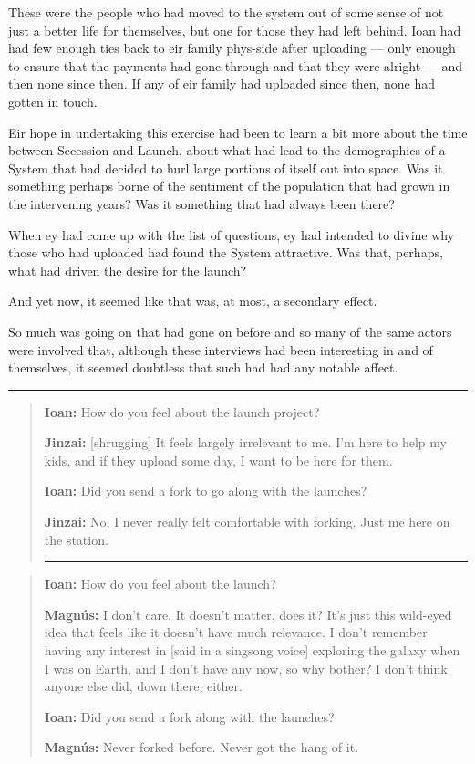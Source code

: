 These were the people who had moved to the system out of some sense of not just a better life for themselves, but one for those they had left behind. Ioan had had few enough ties back to eir family phys-side after uploading — only enough to ensure that the payments had gone through and that they were alright — and then none since then. If any of eir family had uploaded since then, none had gotten in touch.

Eir hope in undertaking this exercise had been to learn a bit more about the time between Secession and Launch, about what had lead to the demographics of a System that had decided to hurl large portions of itself out into space. Was it something perhaps borne of the sentiment of the population that had grown in the intervening years? Was it something that had always been there?

When ey had come up with the list of questions, ey had intended to divine why those who had uploaded had found the System attractive. Was that, perhaps, what had driven the desire for the launch?

And yet now, it seemed like that was, at most, a secondary effect.

So much was going on that had gone on before and so many of the same actors were involved that, although these interviews had been interesting in and of themselves, it seemed doubtless that such had had any notable affect.

\begin{center}\rule{0.5\linewidth}{0.5pt}\end{center}

\begin{quote}
\textbf{Ioan:} How do you feel about the launch project?

\textbf{Jinzai:} {[}shrugging{]} It feels largely irrelevant to me. I'm here to help my kids, and if they upload some day, I want to be here for them.

\textbf{Ioan:} Did you send a fork to go along with the launches?

\textbf{Jinzai:} No, I never really felt comfortable with forking. Just me here on the station.

\begin{center}\rule{0.5\linewidth}{0.5pt}\end{center}
\end{quote}

\begin{quote}
\textbf{Ioan:} How do you feel about the launch?

\textbf{Magnús:} I don't care. It doesn't matter, does it? It's just this wild-eyed idea that feels like it doesn't have much relevance. I don't remember having any interest in {[}said in a singsong voice{]} exploring the galaxy when I was on Earth, and I don't have any now, so why bother? I don't think anyone else did, down there, either.

\textbf{Ioan:} Did you send a fork along with the launches?

\textbf{Magnús:} Never forked before. Never got the hang of it.
\end{quote}

